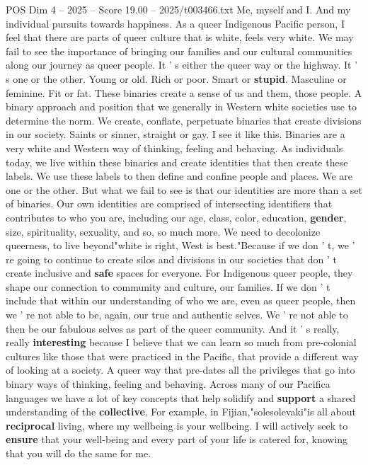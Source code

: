 \begin{textsample}{POS Dim 4 – 2025 – Score 19.00 – 2025/t003466.txt}
Me, myself and I.
And my individual pursuits towards happiness.
As a queer Indigenous Pacific person, I feel that there are parts of queer culture that is white, feels very white.
We may fail to see the importance of bringing our families and our cultural communities along our journey as queer people.
It ' s either the queer way or the highway.
It ' s one or the other.
Young or old.
Rich or poor.
Smart or \textbf{stupid}.
Masculine or feminine.
Fit or fat.
These binaries create a sense of us and them, those people.
A binary approach and position that we generally in Western white societies use to determine the norm.
We create, conflate, perpetuate binaries that create divisions in our society.
Saints or sinner, straight or gay.
I see it like this.
Binaries are a very white and Western way of thinking, feeling and behaving.
As individuals today, we live within these binaries and create identities that then create these labels.
We use these labels to then define and confine people and places.
We are one or the other.
But what we fail to see is that our identities are more than a set of binaries.
Our own identities are comprised of intersecting identifiers that contributes to who you are, including our age, class, color, education, \textbf{gender}, size, spirituality, sexuality, and so, so much more.
We need to decolonize queerness, to live beyond"white is right, West is best."Because if we don ' t, we ' re going to continue to create silos and divisions in our societies that don ' t create inclusive and \textbf{safe} spaces for everyone.
For Indigenous queer people, they shape our connection to community and culture, our families.
If we don ' t include that within our understanding of who we are, even as queer people, then we ' re not able to be, again, our true and authentic selves.
We ' re not able to then be our fabulous selves as part of the queer community.
And it ' s really, really \textbf{interesting} because I believe that we can learn so much from pre-colonial cultures like those that were practiced in the Pacific, that provide a different way of looking at a society.
A queer way that pre-dates all the privileges that go into binary ways of thinking, feeling and behaving.
Across many of our Pacifica languages we have a lot of key concepts that help solidify and \textbf{support} a shared understanding of the \textbf{collective}.
For example, in Fijian,"solesolevaki"is all about \textbf{reciprocal} living, where my wellbeing is your wellbeing.
I will actively seek to \textbf{ensure} that your well-being and every part of your life is catered for, knowing that you will do the same for me.

\end{textsample}
